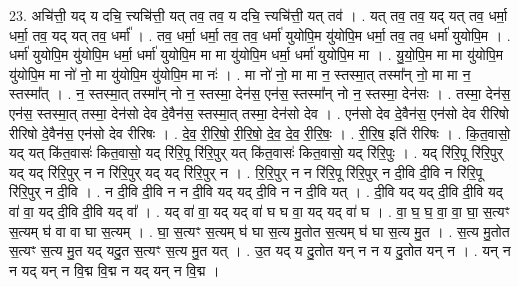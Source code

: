 \documentclass[17pt]{extarticle}
\begin{document}
23. अचि॑त्ती॒ यद् य दचि॒ त्त्यचि॑त्ती॒ यत् तव॒ तव॒ य दचि॒ त्त्यचि॑त्ती॒ यत् तव॑ । . यत् तव॒ तव॒ यद् यत् तव॒ धर्मा॒ धर्मा॒ तव॒ यद् यत् तव॒ धर्मा᳚ । . तव॒ धर्मा॒ धर्मा॒ तव॒ तव॒ धर्मा॑ युयोपि॒म यु॑योपि॒म धर्मा॒ तव॒ तव॒ धर्मा॑ युयोपि॒म । . धर्मा॑ युयोपि॒म यु॑योपि॒म धर्मा॒ धर्मा॑ युयोपि॒म मा मा यु॑योपि॒म धर्मा॒ धर्मा॑ युयोपि॒म मा । . यु॒यो॒पि॒म मा मा यु॑योपि॒म यु॑योपि॒म मा नो॑ नो॒ मा यु॑योपि॒म यु॑योपि॒म मा नः॑ । . मा नो॑ नो॒ मा मा न॒ स्तस्मा॒त् तस्मा᳚न् नो॒ मा मा न॒ स्तस्मा᳚त् । . न॒ स्तस्मा॒त् तस्मा᳚न् नो न॒ स्तस्मा॒ देन॑स॒ एन॑स॒ स्तस्मा᳚न् नो न॒ स्तस्मा॒ देन॑सः । . तस्मा॒ देन॑स॒ एन॑स॒ स्तस्मा॒त् तस्मा॒ देन॑सो देव दे॒वैन॑स॒ स्तस्मा॒त् तस्मा॒ देन॑सो देव । . एन॑सो देव दे॒वैन॑स॒ एन॑सो देव रीरिषो रीरिषो दे॒वैन॑स॒ एन॑सो देव रीरिषः । . दे॒व॒ री॒रि॒षो॒ री॒रि॒षो॒ दे॒व॒ दे॒व॒ री॒रि॒षः॒ । . री॒रि॒ष॒ इति॑ रीरिषः । . कि॒त॒वासो॒ यद् यत् कि॑त॒वासः॑ कित॒वासो॒ यद् रि॑रि॒पू रि॑रि॒पुर् यत् कि॑त॒वासः॑ कित॒वासो॒ यद् रि॑रि॒पुः । . यद् रि॑रि॒पू रि॑रि॒पुर् यद् यद् रि॑रि॒पुर् न न रि॑रि॒पुर् यद् यद् रि॑रि॒पुर् न । . रि॒रि॒पुर् न न रि॑रि॒पू रि॑रि॒पुर् न दी॒वि दी॒वि न रि॑रि॒पू रि॑रि॒पुर् न दी॒वि । . न दी॒वि दी॒वि न न दी॒वि यद् यद् दी॒वि न न दी॒वि यत् । . दी॒वि यद् यद् दी॒वि दी॒वि यद् वा॑ वा॒ यद् दी॒वि दी॒वि यद् वा᳚ । . यद् वा॑ वा॒ यद् यद् वा॑ घ घ वा॒ यद् यद् वा॑ घ । . वा॒ घ॒ घ॒ वा॒ वा॒ घा॒ स॒त्यꣳ स॒त्यम् घ॑ वा वा घा स॒त्यम् । . घा॒ स॒त्यꣳ स॒त्यम् घ॑ घा स॒त्य मु॒तोत स॒त्यम् घ॑ घा स॒त्य मु॒त । . स॒त्य मु॒तोत स॒त्यꣳ स॒त्य मु॒त यद् यदु॒त स॒त्यꣳ स॒त्य मु॒त यत् । . उ॒त यद् य दु॒तोत यन् न न य दु॒तोत यन् न । . यन् न न यद् यन् न वि॒द्म वि॒द्म न यद् यन् न वि॒द्म । \newline
\end{document}
